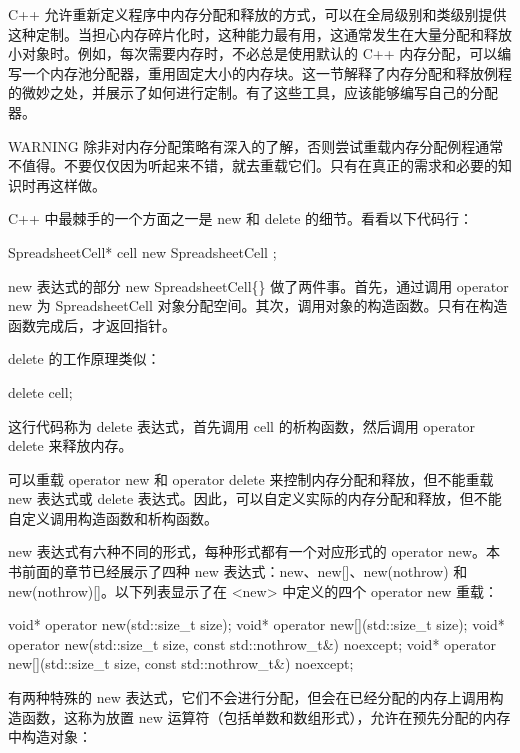 
C++ 允许重新定义程序中内存分配和释放的方式，可以在全局级别和类级别提供这种定制。当担心内存碎片化时，这种能力最有用，这通常发生在大量分配和释放小对象时。例如，每次需要内存时，不必总是使用默认的 C++ 内存分配，可以编写一个内存池分配器，重用固定大小的内存块。这一节解释了内存分配和释放例程的微妙之处，并展示了如何进行定制。有了这些工具，应该能够编写自己的分配器。

\begin{myWarning}{WARNING}
除非对内存分配策略有深入的了解，否则尝试重载内存分配例程通常不值得。不要仅仅因为听起来不错，就去重载它们。只有在真正的需求和必要的知识时再这样做。
\end{myWarning}


C++ 中最棘手的一个方面之一是 new 和 delete 的细节。看看以下代码行：

\begin{cpp}
SpreadsheetCell* cell { new SpreadsheetCell {} };
\end{cpp}

new 表达式的部分 new SpreadsheetCell\{\} 做了两件事。首先，通过调用 operator new 为 SpreadsheetCell 对象分配空间。其次，调用对象的构造函数。只有在构造函数完成后，才返回指针。

delete 的工作原理类似：

\begin{cpp}
delete cell;
\end{cpp}

这行代码称为 delete 表达式，首先调用 cell 的析构函数，然后调用 operator delete 来释放内存。

可以重载 operator new 和 operator delete 来控制内存分配和释放，但不能重载 new 表达式或 delete 表达式。因此，可以自定义实际的内存分配和释放，但不能自定义调用构造函数和析构函数。


new 表达式有六种不同的形式，每种形式都有一个对应形式的 operator new。本书前面的章节已经展示了四种 new 表达式：new、new[]、new(nothrow) 和 new(nothrow)[]。以下列表显示了在 <new> 中定义的四个 operator new 重载：

\begin{cpp}
void* operator new(std::size_t size);
void* operator new[](std::size_t size);
void* operator new(std::size_t size, const std::nothrow_t&) noexcept;
void* operator new[](std::size_t size, const std::nothrow_t&) noexcept;
\end{cpp}

有两种特殊的 new 表达式，它们不会进行分配，但会在已经分配的内存上调用构造函数，这称为放置 new 运算符（包括单数和数组形式），允许在预先分配的内存中构造对象：

